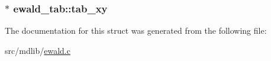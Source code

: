\hypertarget{structewald__tab_a89dbf2666a697443ed66a92aecf59671}{
\subsubsection[{tab\-\_\-xy}]{$\ast$ {\bf ewald\-\_\-tab\-::tab\-\_\-xy}}}\label{structewald__tab_a89dbf2666a697443ed66a92aecf59671}


\-The documentation for this struct was generated from the following file\-:\begin{DoxyCompactItemize}
\item 
src/mdlib/\hyperlink{ewald_8c}{ewald.\-c}\end{DoxyCompactItemize}
